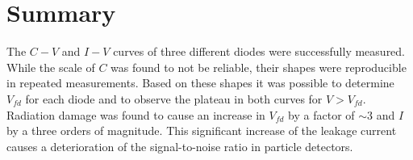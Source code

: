 \documentclass[11pt]{article}
\begin{document}
\section{Summary}
\label{sec:summary}
The $C-V$ and $I-V$ curves of three different diodes were successfully measured.
While the scale of $C$ was found to not be reliable, their shapes were reproducible in repeated measurements.
Based on these shapes it was possible to determine $V_{fd}$ for each diode and to observe the plateau in both curves for $V>V_{fd}$.
Radiation damage was found to cause an increase in $V_{fd}$ by a factor of $\sim 3$ and $I$ by a three orders of magnitude.
This significant increase of the leakage current causes a deterioration of the signal-to-noise ratio in particle detectors.

\printbibliography
\end{document}
